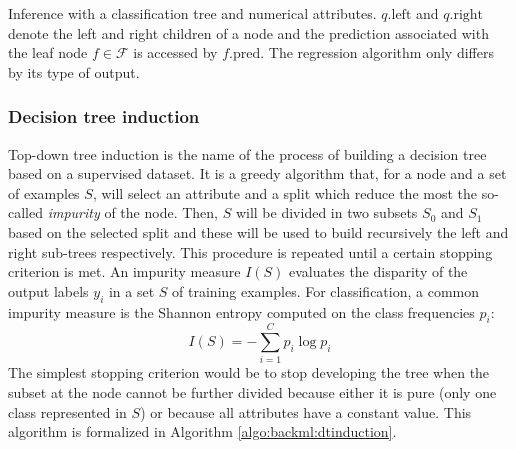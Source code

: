 \begin{algorithm}[t]
  \SetAlgoLined
  \caption{Inference with a classification tree and numerical attributes. $q.\text{left}$ and $q.\text{right}$ denote the left and right children of a node and the prediction associated with the leaf node $f \in \mathcal{F}$ is accessed by $f.\text{pred}$. The regression algorithm only differs by its type of output.}
  \label{algo:backml:dtinference}
\end{algorithm}

\subsubsection{Decision tree induction}
\label{sssec:backml:dtinduction}

Top-down tree induction is the name of the process of building a decision tree based on a supervised dataset. It is a greedy algorithm that, for a node and a set of examples $S$, will select an attribute and a split which reduce the most the so-called \textit{impurity} of the node. Then, $S$ will be divided in two subsets $S_0$ and $S_1$ based on the selected split and these will be used to build recursively the left and right sub-trees respectively. This procedure is repeated until a certain stopping criterion is met. An impurity measure $I(S)$ evaluates the disparity of the output labels $y_i$ in a set $S$ of training examples. For classification, a common impurity measure is the Shannon entropy computed on the class frequencies $p_i$:
\begin{equation}
\label{eqn:backml:shannon_entropy}
I(S) = - \sum_{i=1}^C p_i \log p_i
\end{equation}
The simplest stopping criterion would be to stop developing the tree when the subset at the node cannot be further divided because either it is pure (\eg only one class represented in $S$) or because all attributes have a constant value. This algorithm is formalized in Algorithm \ref{algo:backml:dtinduction}. 


